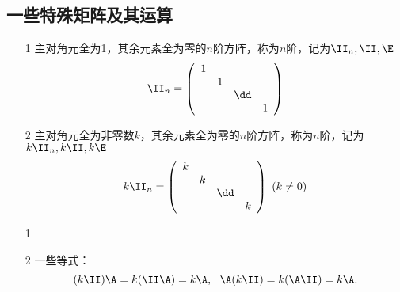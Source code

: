\subsection{一些特殊矩阵及其运算}

% 
\begin{dingyi}[单位矩阵与数量矩阵]
  \begin{itemize}
  \item[1] 主对角元全为1，其余元素全为零的$n$阶方阵，称为$n$阶，记为$\II_n, \II, \E$
    $$
    \II_n = \left(
      \begin{array}{cccc}
        1 & & &\\
          & 1 & & \\
          & & \dd & \\
          & & & 1
      \end{array}
    \right)
    $$ 
  \item[2] 主对角元全为非零数$k$，其余元素全为零的$n$阶方阵，称为$n$阶，记为$k\II_n, k\II, k\E$
    $$
    k\II_n = \left(
      \begin{array}{cccc}
        k & & &\\
          & k & & \\
          & & \dd & \\
          & & & k
      \end{array}
    \right)~(k\ne 0)
    $$
  \end{itemize}
\end{dingyi}
% 
\begin{zhu*}
  \begin{itemize}
  \item[1] 
  \item[2] 一些等式：
    $$
    (k\II) \A = k(\II\A) = k\A, ~~
    \A(k\II) = k(\A\II) = k\A.
    $$
  \end{itemize}
\end{zhu*}


